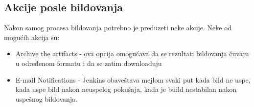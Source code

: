 \subsection{Akcije posle bildovanja}

Nakon samog procesa bildovanja potrebno je preduzeti neke akcije. Neke od mogućih akcija su:
\begin{itemize}
\item Archive the artifacts - ova opcija omogućava da se rezultati bildovanja čuvaju u određenom formatu i da se zatim downloaduju
\item E-mail Notifications - Jenkins obaveštava mejlom svaki put kada bild ne uspe, kada uspe bild nakon neuspelog pokušaja, kada je build nestabilan nakon uspešnog bildovanja.
\end{itemize}
